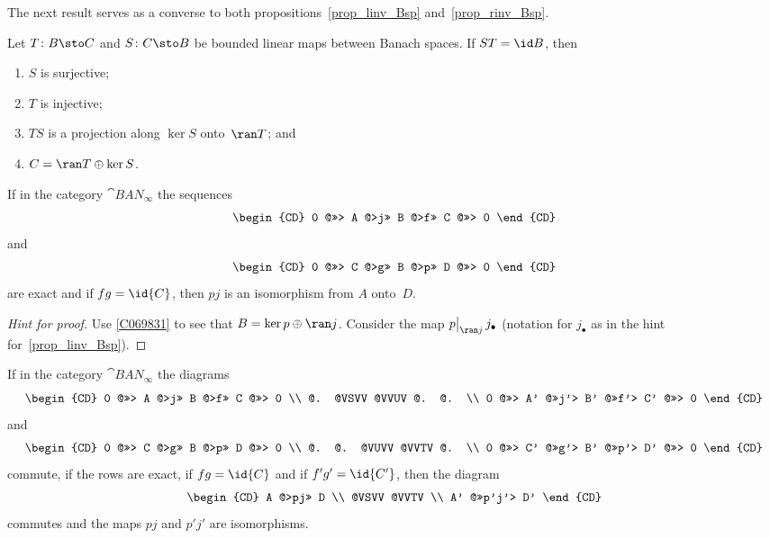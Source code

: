 The next result serves as a converse to both propositions~\ref{prop_linv_Bsp} and~\ref{prop_rinv_Bsp}.

\begin{prop}\label{C069831} Let $T \colon B \sto C$ and $S\colon C \sto B$ be bounded linear maps between Banach
spaces.  If $ST = \id B$, then
 \begin{enumerate}[label=\rm{(\alph*)}]
  \item[(a)] $S$ is surjective;
  \item[(b)] $T$ is injective;
  \item[(c)] $TS$ is a projection along $\ker S$ onto~$\ran T$; and
  \item[(d)] $C = \ran T \oplus \ker S$.
 \end{enumerate}
\end{prop}

\begin{prop} If in the category $\cat{BAN_\infty}$ the sequences
 \[ \begin{CD} 0 @>>> A @>j>> B @>f>> C @>>> 0
    \end{CD}\]
 and
 \[ \begin{CD} 0 @>>> C @>g>> B @>p>> D @>>> 0
    \end{CD}\]
are exact and if $fg = \id{C}$, then $pj$ is an isomorphism from $A$ onto~$D$.
\end{prop}

\begin{proof}[\emph{Hint for proof}] Use \ref{C069831} to see that $B = \ker p \oplus \ran j$. Consider the map
$\bigl.p\bigr|_{\ran j}\,j_\bullet$ (notation for $j_\bullet$ as in the hint for~\ref{prop_linv_Bsp}). \ns
\end{proof}

\begin{prop}\label{prop_merge_exactCD} If in the category $\cat{BAN_\infty}$ the diagrams
 \begin{equation} \begin{CD} 0 @>>> A @>j>> B @>f>> C @>>> 0  \\
      @.   @VSVV   @VVUV   @.    @.    \\
 0 @>>> A' @>>j'> B' @>>f'> C' @>>> 0
    \end{CD}\end{equation}
and
 \[ \begin{CD} 0 @>>> C @>g>> B @>p>> D @>>> 0   \\
      @.     @.   @VUVV   @VVTV     @.  \\
  0 @>>> C' @>>g'> B' @>>p'> D' @>>> 0
    \end{CD}\]
commute, if the rows are exact, if $fg = \id{C}$ and if $f'g' = \id{C'}$, then the diagram
 \[ \begin{CD}  A  @>pj>>  D   \\
       @VSVV   @VVTV  \\
     A'  @>>p'j'> D'
    \end{CD}\]
commutes and the maps $pj$ and $p'j'$ are isomorphisms.
\end{prop}

